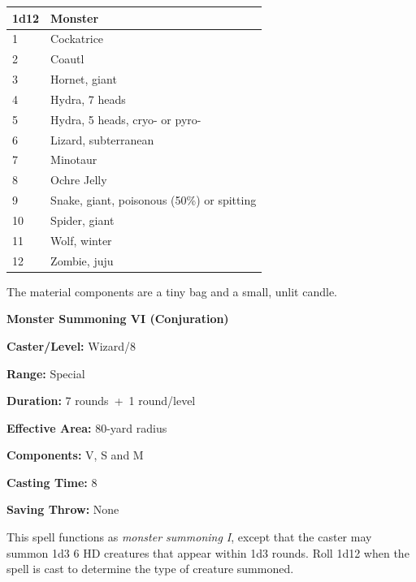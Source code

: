 \begin{multicols}{2}
\noindent
\begin{tabular}{|p{}|p{}|}
\hline
1d12	& Monster \\
\hline\hline
\rowcolor[gray]{.9}1	& Cockatrice \\
2	& Coautl \\
\rowcolor[gray]{.9}3	& Hornet, giant \\
4	& Hydra, 7 heads \\
\rowcolor[gray]{.9}5	& Hydra, 5 heads, cryo- or pyro- \\
6	& Lizard, subterranean \\
\rowcolor[gray]{.9}7	& Minotaur \\
8	& Ochre Jelly \\
\rowcolor[gray]{.9}9	& Snake, giant, poisonous (50\%) or spitting \\
10	& Spider, giant \\
\rowcolor[gray]{.9}11	& Wolf, winter \\
12	& Zombie, juju \\
\hline
\end{tabular}

The material components are a tiny bag and a small, unlit candle.

\vspace{1em}

\noindent
\begin{minipage}{\columnwidth}

\noindent \textbf{Monster Summoning VI (Conjuration)}

\noindent \textbf{Caster/Level:} Wizard/8

\noindent \textbf{Range:} Special

\noindent \textbf{Duration:} 7 rounds~+~1 round/level

\noindent \textbf{Effective Area:} 80-yard radius

\noindent \textbf{Components:} V, S and M

\noindent \textbf{Casting Time:} 8

\noindent \textbf{Saving Throw:} None

\end{minipage}

This spell functions as \textit{monster summoning I}, except that the caster may summon 1d3 6 HD creatures that appear within 1d3 rounds.  Roll 1d12 when the spell is cast to determine the type of creature summoned.


\end{multicols}
